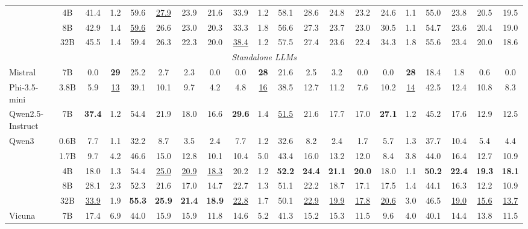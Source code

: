 \begin{table}[t]
{\begin{tabular}{lc|cccccc|cccccc|cccccc}
 & 4B & 41.4 & 1.2 & 59.6 & \underline{27.9} & 23.9 & 21.6 & 33.9 & 1.2 & 58.1 & 28.6 & 24.8 & 23.2 & 24.6 & 1.1 & 55.0 & 23.8 & 20.5 & 19.5 \\
 & 8B & 42.9 & 1.4 & \underline{59.6} & 26.6 & 23.0 & 20.3 & 33.3 & 1.8 & 56.6 & 27.3 & 23.7 & 23.0 & 30.5 & 1.1 & 54.7 & 23.6 & 20.4 & 19.0 \\
 & 32B & 45.5 & 1.4 & 59.4 & 26.3 & 22.3 & 20.0 & \underline{38.4} & 1.2 & 57.5 & 27.4 & 23.6 & 22.4 & 34.3 & 1.8 & 55.6 & 23.4 & 20.0 & 18.6 \\
\midrule
\multicolumn{20}{c}{\textit{Standalone LLMs}} \\
\midrule
Mistral & 7B & 0.0 & \textbf{29} & 25.2 & 2.7 & 2.3 & 0.0 & 0.0 & \textbf{28} & 21.6 & 2.5 & 3.2 & 0.0 & 0.0 & \textbf{28} & 18.4 & 1.8 & 0.6 & 0.0 \\
Phi-3.5-mini & 3.8B & 5.9 & \underline{13} & 39.1 & 10.1 & 9.7 & 4.2 & 4.8 & \underline{16} & 38.5 & 12.7 & 11.2 & 7.6 & 10.2 & \underline{14} & 42.5 & 12.4 & 10.8 & 8.3 \\
Qwen2.5-Instruct & 7B & \textbf{37.4} & 1.2 & 54.4 & 21.9 & 18.0 & 16.6 & \textbf{29.6} & 1.4 & \underline{51.5} & 21.6 & 17.7 & 17.0 & \textbf{27.1} & 1.2 & 45.2 & 17.6 & 12.9 & 12.5 \\
\multirow{5}{*}{Qwen3} & 0.6B & 7.7 & 1.1 & 32.2 & 8.7 & 3.5 & 2.4 & 7.7 & 1.2 & 32.6 & 8.2 & 2.4 & 1.7 & 5.7 & 1.3 & 37.7 & 10.4 & 5.4 & 4.4 \\
 & 1.7B & 9.7 & 4.2 & 46.6 & 15.0 & 12.8 & 10.1 & 10.4 & 5.0 & 43.4 & 16.0 & 13.2 & 12.0 & 8.4 & 3.8 & 44.0 & 16.4 & 12.7 & 10.9 \\
 & 4B & 18.0 & 1.3 & 54.4 & \underline{25.0} & \underline{20.9} & \underline{18.3} & 20.2 & 1.2 & \textbf{52.2} & \textbf{24.4} & \textbf{21.1} & \textbf{20.0} & 18.0 & 1.1 & \textbf{50.2} & \textbf{22.4} & \textbf{19.3} & \textbf{18.1} \\
 & 8B & 28.1 & 2.3 & 52.3 & 21.6 & 17.0 & 14.7 & 22.7 & 1.3 & 51.1 & 22.2 & 18.7 & 17.1 & 17.5 & 1.4 & 44.1 & 16.3 & 12.2 & 10.9 \\
 & 32B & \underline{33.9} & 1.9 & \textbf{55.3} & \textbf{25.9} & \textbf{21.4} & \textbf{18.9} & \underline{22.8} & 1.7 & 50.1 & \underline{22.9} & \underline{19.9} & \underline{17.8} & \underline{20.6} & 3.0 & 46.5 & \underline{19.0} & \underline{15.6} & \underline{13.7} \\
\multirow{2}{*}{Vicuna} & 7B & 17.4 & 6.9 & 44.0 & 15.9 & 15.9 & 11.8 & 14.6 & 5.2 & 41.3 & 15.2 & 15.3 & 11.5 & 9.6 & 4.0 & 40.1 & 14.4 & 13.8 & 11.5 \\

\end{tabular}}
\end{table}
